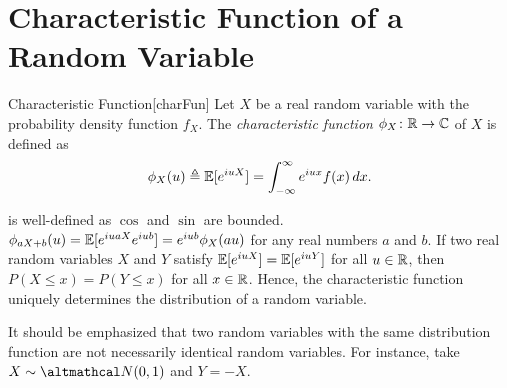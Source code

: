\documentclass[../probability.tex]{subfiles}
\begin{document}
\section{Characteristic Function of a Random Variable}

\begin{Definition}{Characteristic Function}[charFun]
    Let \(X\) be a real random variable with the probability density function \(f_X\).
    The \emph{characteristic function} \(\phi_X \colon \RR \to \CC\) of \(X\) is defined as
    \[
        \phi_X(u) \triangleq \mathbb{E}[e^{iuX}] = \int_{-\infty}^{\infty} e^{iux} f(x) \,dx\text.
    \]
\end{Definition}

\begin{note}
\begin{itemize}
    \ii
     is well-defined
    as \(\cos\) and \(\sin\) are bounded.
    \ii
    \(\phi_{aX+b}(u) = \mathbb{E}[e^{iuaX}e^{iub}]=e^{iub}\phi_X(au)\)
    for any real numbers \(a\) and \(b\).
    \ii
    If two real random variables \(X\) and \(Y\) satisfy
    \(\mathbb{E}[e^{iuX}] = \mathbb{E}[e^{iuY}]\) for all \(u \in \RR\),
    then \(P(X \le x) = P(Y \le x)\) for all \(x \in \RR\).
    Hence, the characteristic function uniquely determines the distribution of a random variable.

    \ii
    It should be emphasized that two random variables with the same distribution function
    are not necessarily identical random variables.
    For instance, take \(X \sim \mcal{N}(0,1)\) and \(Y = -X\).
\end{itemize}
\end{note}

\end{document}

